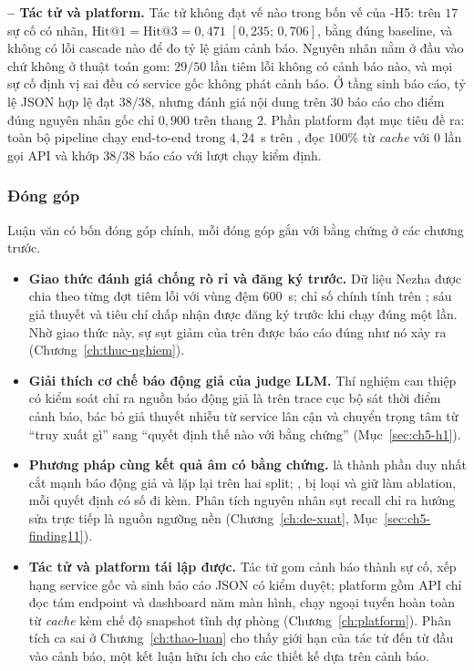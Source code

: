 \textbf{ -- Tác tử  và platform.}
Tác tử  không đạt vế nào trong bốn vế của \hyp{H5}: trên $17$ sự cố có nhãn, $\text{Hit@1} = \text{Hit@3} = 0{,}471$ $[0{,}235;\, 0{,}706]$, bằng đúng baseline, và không có lỗi cascade nào để đo tỷ lệ giảm cảnh báo. Nguyên nhân nằm ở đầu vào chứ không ở thuật toán gom: $29/50$ lần tiêm lỗi không có cảnh báo nào, và mọi sự cố định vị sai đều có service gốc không phát cảnh báo. Ở tầng sinh báo cáo, tỷ lệ JSON hợp lệ đạt $38/38$, nhưng đánh giá nội dung trên $30$ báo cáo cho điểm đúng nguyên nhân gốc chỉ $0{,}900$ trên thang $2$. Phần platform đạt mục tiêu đề ra: toàn bộ pipeline chạy end-to-end trong $4{,}24$~s trên , đọc $100\%$ từ \textit{cache} với $0$ lần gọi API và khớp $38/38$ báo cáo với lượt chạy kiểm định. %

\subsubsection{Đóng góp}
\label{sec:ch8-dong-gop}

Luận văn có bốn đóng góp chính, mỗi đóng góp gắn với bằng chứng ở các chương trước.

\begin{itemize}[label=--]
  \item \textbf{Giao thức đánh giá chống rò rỉ và đăng ký trước.} Dữ liệu Nezha được chia theo từng đợt tiêm lỗi với vùng đệm $600$~s; chỉ số chính tính trên ; sáu giả thuyết và tiêu chí chấp nhận được đăng ký trước khi chạy  đúng một lần. Nhờ giao thức này, sự sụt giảm của \CTAV{} trên  được báo cáo đúng như nó xảy ra (Chương~\ref{ch:thuc-nghiem}).
  \item \textbf{Giải thích cơ chế báo động giả của judge LLM.} Thí nghiệm can thiệp có kiểm soát chỉ ra nguồn báo động giả là  trên trace cục bộ sát thời điểm cảnh báo, bác bỏ giả thuyết nhiễu từ service lân cận và chuyển trọng tâm từ ``truy xuất gì'' sang ``quyết định thế nào với bằng chứng'' (Mục~\ref{sec:ch5-h1}).
  \item \textbf{Phương pháp \CTAV{} cùng kết quả âm có bằng chứng.}  là thành phần duy nhất cắt mạnh báo động giả và lặp lại trên hai split; ,  bị loại và  giữ làm ablation, mỗi quyết định có số đi kèm. Phân tích nguyên nhân sụt recall chỉ ra hướng sửa trực tiếp là nguồn ngưỡng nền (Chương~\ref{ch:de-xuat}, Mục~\ref{sec:ch5-finding11}).
  \item \textbf{Tác tử  và platform tái lập được.} Tác tử gom cảnh báo thành sự cố, xếp hạng service gốc và sinh báo cáo JSON có kiểm duyệt; platform gồm API chỉ đọc tám endpoint và dashboard năm màn hình, chạy ngoại tuyến hoàn toàn từ \textit{cache} kèm chế độ snapshot tĩnh dự phòng (Chương~\ref{ch:platform}). Phân tích ca sai ở Chương~\ref{ch:thao-luan} cho thấy giới hạn của tác tử đến từ đầu vào cảnh báo, một kết luận hữu ích cho các thiết kế  dựa trên cảnh báo.
\end{itemize}

